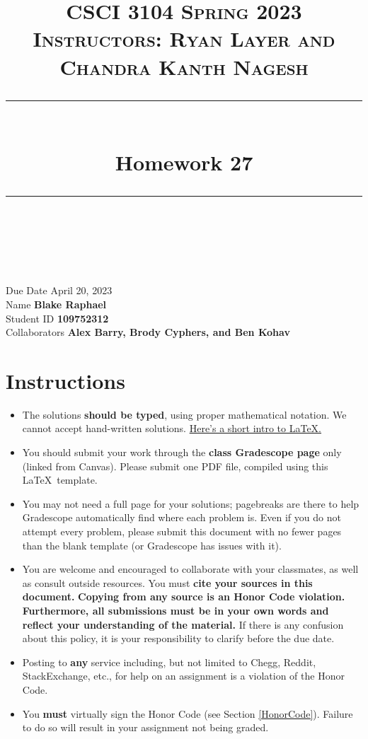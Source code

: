 \documentclass[11pt]{article}
\title{
\normalfont \normalsize
\textsc{CSCI 3104 Spring 2023 \\
Instructors: Ryan Layer and Chandra Kanth Nagesh} \\
[10pt]
\rule{\linewidth}{0.5pt} \\[6pt]
\huge Homework 27 \\
\rule{\linewidth}{2pt}  \\[10pt]
}
\author{}
\date{}
\theoremstyle{definition}
\theoremstyle{definition}
\theoremstyle{definition}
\begin{document}

\maketitle


\noindent
Due Date \dotfill April 20, 2023 \\
Name \dotfill \textbf{Blake Raphael} \\
Student ID \dotfill \textbf{109752312} \\
Collaborators \dotfill \textbf{Alex Barry, Brody Cyphers, and Ben Kohav}

\tableofcontents

\section{Instructions}
 \begin{itemize}
	\item The solutions \textbf{should be typed}, using proper mathematical notation. We cannot accept hand-written solutions. \href{http://ece.uprm.edu/~caceros/latex/introduction.pdf}{Here's a short intro to \LaTeX.}
	\item You should submit your work through the \textbf{class Gradescope page} only (linked from Canvas). Please submit one PDF file, compiled using this \LaTeX \ template.
	\item You may not need a full page for your solutions; pagebreaks are there to help Gradescope automatically find where each problem is. Even if you do not attempt every problem, please submit this document with no fewer pages than the blank template (or Gradescope has issues with it).

	\item You are welcome and encouraged to collaborate with your classmates, as well as consult outside resources. You must \textbf{cite your sources in this document.} \textbf{Copying from any source is an Honor Code violation. Furthermore, all submissions must be in your own words and reflect your understanding of the material.} If there is any confusion about this policy, it is your responsibility to clarify before the due date. 

	\item Posting to \textbf{any} service including, but not limited to Chegg, Reddit, StackExchange, etc., for help on an assignment is a violation of the Honor Code.

	\item You \textbf{must} virtually sign the Honor Code (see Section \ref{HonorCode}). Failure to do so will result in your assignment not being graded.
\end{itemize}
\end{document}
